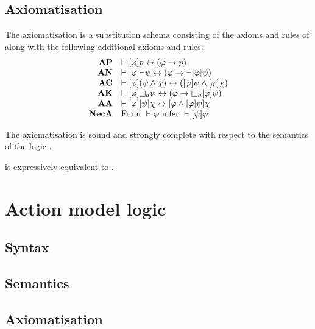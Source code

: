 \subsection{Axiomatisation}

\begin{definition}
The axiomatisation \axiomPalS{} is a substitution schema consisting of the axioms and rules of \axiomS{} along with the following additional axioms and rules:
$$
\begin{array}{rl}
    {\bf AP} & \proves \announceA{\phi} \atomP \iff (\phi \implies \atomP)\\
    {\bf AN} & \proves \announceA{\phi} \lnot \psi \iff (\phi \implies \lnot \announceA{\phi} \psi)\\
    {\bf AC} & \proves \announceA{\phi} (\psi \land \chi) \iff (\announceA{\phi} \psi \land \announceA{\phi} \chi)\\
    {\bf AK} & \proves \announceA{\phi} \necessary[\agentA] \psi \iff (\phi \implies \necessary[\agentA] \announceA{\phi} \psi)\\
    {\bf AA} & \proves \announceA{\phi} \announceA{\psi} \chi \iff \announceA{\phi \land \announceA{\phi} \psi} \chi\\
    {\bf NecA} & \text{From } \proves \phi \text{ infer } \proves \announceA{\psi} \phi
\end{array}
$$
\end{definition}

\begin{proposition}
The axiomatisation \axiomPalS{} is sound and strongly complete with respect to the semantics of the logic \logicPalS{}.
\end{proposition}

\begin{proposition}
\logicPalS{} is expressively equivalent to \logicS{}.
\end{proposition}

\section{Action model logic}

\subsection{Syntax}

\subsection{Semantics}

\subsection{Axiomatisation}
